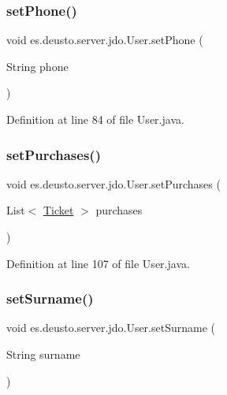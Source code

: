 \mbox{\label{classes_1_1deusto_1_1server_1_1jdo_1_1_user_a2c330811de99729fb430ffe41be0540a}} 
\subsubsection{\texorpdfstring{setPhone()}{setPhone()}}
{\footnotesize\ttfamily void es.\+deusto.\+server.\+jdo.\+User.\+set\+Phone (\begin{DoxyParamCaption}\item[{String}]{phone }\end{DoxyParamCaption})}



Definition at line 84 of file User.\+java.

\mbox{\label{classes_1_1deusto_1_1server_1_1jdo_1_1_user_a37a375d73be22f96c8fdb5bb69239cfa}} 
\subsubsection{\texorpdfstring{setPurchases()}{setPurchases()}}
{\footnotesize\ttfamily void es.\+deusto.\+server.\+jdo.\+User.\+set\+Purchases (\begin{DoxyParamCaption}\item[{List$<$ \mbox{\hyperlink{classes_1_1deusto_1_1server_1_1jdo_1_1_ticket}{Ticket}} $>$}]{purchases }\end{DoxyParamCaption})}



Definition at line 107 of file User.\+java.

\mbox{\label{classes_1_1deusto_1_1server_1_1jdo_1_1_user_ae429a21d0538859e2300e94ef0a9257a}} 
\subsubsection{\texorpdfstring{setSurname()}{setSurname()}}
{\footnotesize\ttfamily void es.\+deusto.\+server.\+jdo.\+User.\+set\+Surname (\begin{DoxyParamCaption}\item[{String}]{surname }\end{DoxyParamCaption})}



